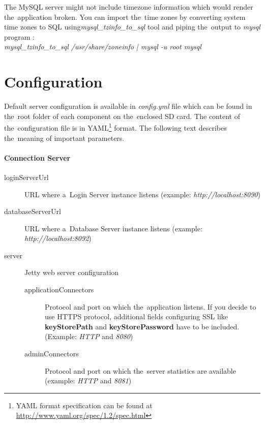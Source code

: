 The MySQL server might not include timezone information which would render the~application broken. You can import the~time zones by converting system time zones to SQL using\textit{mysql\_tzinfo\_to\_sql} tool and piping the~output to \textit{mysql} program \cite{mysqltimezones}:\\
\emph{mysql\_tzinfo\_to\_sql /usr/share/zoneinfo | mysql -u root mysql}

\section{Configuration}
Default server configuration is available in \textit{config.yml} file which can be found in the~root folder of each component on the~enclosed SD card. The content of the~configuration file is in YAML\footnote{YAML format specification can be found at \url{http://www.yaml.org/spec/1.2/spec.html}} format. The following text describes the~meaning of important parameters.

\paragraph*{Connection Server}
\begin{description}
	\item[loginServerUrl] URL where a~Login Server instance listens (example: \textit{http://localhost:8090})
	\item[databaseServerUrl] URL where a~Database Server instance listens (example: \textit{http://localhost:8092})
	\item[server] Jetty web server configuration
		\begin{description}
			\item[applicationConnectors] Protocol and port on which the~application listens. If you decide to use HTTPS protocol, additional fields configuring SSL like \textbf{keyStorePath} and \textbf{keyStorePassword} have to be included. (Example: \textit{HTTP} and \textit{8080})
			\item[adminConnectors] Protocol and port on which the~server statistics are available  (example: \textit{HTTP} and \textit{8081})
		\end{description}
\end{description}

